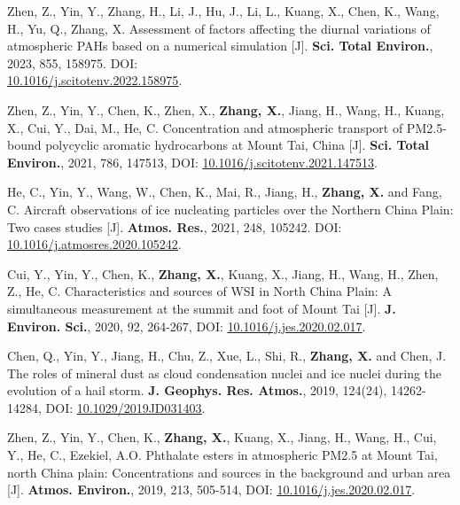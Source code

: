 \begin{enumerate}[label={[\arabic*]}, leftmargin=20pt, widest=0, itemindent=*, topsep=0pt, partopsep=0pt, parsep=0pt]

\item Zhen, Z., Yin, Y., Zhang, H., Li, J., Hu, J., Li, L., Kuang, X., Chen, K., Wang, H., Yu, Q., Zhang, X.
Assessment of factors affecting the diurnal variations of atmospheric PAHs based on a numerical simulation [J].
\textbf{Sci. Total Environ.}, 2023, 855, 158975.
DOI: \\\underline{\href{https://doi.org/10.1016/j.scitotenv.2022.158975}{10.1016/j.scitotenv.2022.158975}}.


\item Zhen, Z., Yin, Y., Chen, K., Zhen, X., \textbf{Zhang, X.}, Jiang, H., Wang, H., Kuang, X., Cui, Y.,
Dai, M., He, C.
Concentration and atmospheric transport of PM2.5-bound polycyclic aromatic hydrocarbons at Mount Tai, China [J].
\textbf{Sci. Total Environ.}, 2021, 786, 147513,
DOI: \underline{\href{https://doi.org/10.1016/j.scitotenv.2021.147513}{10.1016/j.scitotenv.2021.147513}}.

\item He, C., Yin, Y., Wang, W., Chen, K., Mai, R., Jiang, H., \textbf{Zhang, X.} and Fang, C. Aircraft observations of ice nucleating particles over the Northern China Plain: Two cases studies [J].
\textbf{Atmos. Res.}, 2021, 248, 105242.
DOI: \underline{\href{https://doi.org/10.1016/j.atmosres.2020.105242}{10.1016/j.atmosres.2020.105242}}.

\item Cui, Y., Yin, Y., Chen, K., \textbf{Zhang, X.}, Kuang, X., Jiang, H., Wang, H., Zhen, Z., He, C.
Characteristics and sources of WSI in North China Plain: A simultaneous measurement at the summit and foot of Mount Tai [J].
\textbf{J. Environ. Sci.}, 2020, 92, 264-267,
DOI: \underline{\href{https://doi.org/10.1016/j.jes.2020.02.017}{10.1016/j.jes.2020.02.017}}.

\item Chen, Q., Yin, Y., Jiang, H., Chu, Z., Xue, L., Shi, R., \textbf{Zhang, X.} and Chen, J.
The roles of mineral dust as cloud condensation nuclei and ice nuclei during the evolution of a hail storm.
\textbf{J. Geophys. Res. Atmos.}, 2019, 124(24), 14262-14284,
DOI: \underline{\href{https://doi.org/10.1029/2019JD031403}{10.1029/2019JD031403}}.

\item Zhen, Z., Yin, Y., Chen, K., \textbf{Zhang, X.}, Kuang, X., Jiang, H., Wang, H., Cui, Y., He, C.,
Ezekiel, A.O.
Phthalate esters in atmospheric PM2.5 at Mount Tai, north China plain: Concentrations and sources in the background and urban area [J].
\textbf{Atmos. Environ.}, 2019, 213, 505-514,
DOI: \underline{\href{https://doi.org/10.1016/j.atmosenv.2019.06.039}{10.1016/j.jes.2020.02.017}}.

\end{enumerate}


